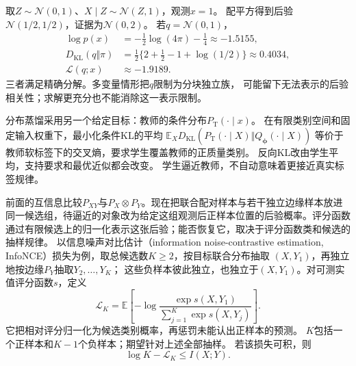 取\(Z\sim\mathcal N(0,1)\)、\(X\mid Z\sim\mathcal N(Z,1)\)，观测\(x=1\)。
配平方得到后验\(\mathcal N(1/2,1/2)\)，证据为\(\mathcal N(0,2)\)。
若\(q=\mathcal N(0,1)\)，
\[
\begin{aligned}
  \log p(x)&=-\tfrac12\log(4\pi)-\tfrac14\approx-1.5155,\\
  D_{\mathrm{KL}}(q\Vert\pi)
  &=\tfrac12\{2+\tfrac12-1+\log(1/2)\}\approx0.4034,\\
  \mathcal L(q;x)&\approx-1.9189.
\end{aligned}
\]
三者满足精确分解。多变量情形把\(q\)限制为分块独立族，
可能留下无法表示的后验相关性；求解更充分也不能消除这一表示限制。

分布蒸馏采用另一个给定目标：教师的条件分布\(P_{\mathrm T}(\cdot\mid x)\)。
在有限类别空间和固定输入权重下，最小化条件KL的平均
\(\mathbb E_XD_{\mathrm{KL}}(P_{\mathrm T}(\cdot\mid X)\Vert Q_{\bm\phi}(\cdot\mid X))\)
等价于教师软标签下的交叉熵，要求学生覆盖教师的正质量类别。
反向KL改由学生平均，支持要求和最优近似都会改变。
学生逼近教师，不自动意味着更接近真实标签规律。

前面的互信息比较\(P_{XY}\)与\(P_X\otimes P_Y\)。现在把联合配对样本与若干独立边缘样本放进同一候选组，待逼近的对象改为给定这组观测后正样本位置的后验概率。评分函数通过有限候选上的归一化表示这张后验；能否恢复它，取决于评分函数类和候选的抽样规律。
以信息噪声对比估计（information noise-contrastive estimation, InfoNCE）损失为例，取总候选数\(K\geq2\)，按目标联合分布抽取
\((X,Y_1)\)，再独立地按边缘\(P_Y\)抽取\(Y_2,\ldots,Y_K\)；
这些负样本彼此独立，也独立于\((X,Y_1)\)。对可测实值评分函数\(s\)，定义
\begin{equation}
 \mathcal L_K
 =\mathbb E\left[-\log
   \frac{\exp s(X,Y_1)}{\sum_{j=1}^K\exp s(X,Y_j)}\right].
 \label{eq:information-contrastive-loss}
\end{equation}
它把相对评分归一化为候选类别概率，再惩罚未能认出正样本的预测。
\(K\)包括一个正样本和\(K-1\)个负样本；期望针对上述全部抽样。
若该损失可积，则
\[
 \log K-\mathcal L_K\leq I(X;Y).
\]

